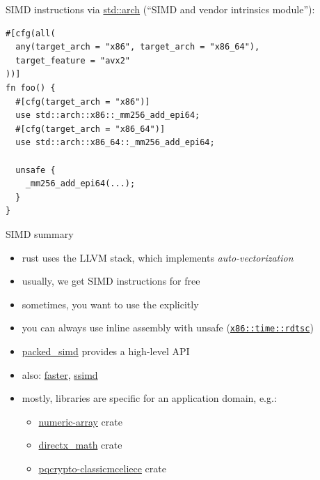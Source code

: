 \documentclass{beamer}
\begin{document}
\begin{frame}[fragile]{SIMD instructions}
  via \href{https://doc.rust-lang.org/1.29.0/std/arch/}{std::arch} (\enquote{SIMD and vendor intrinsics module}):

  \begin{verbatim}
#[cfg(all(
  any(target_arch = "x86", target_arch = "x86_64"),
  target_feature = "avx2"
))]
fn foo() {
  #[cfg(target_arch = "x86")]
  use std::arch::x86::_mm256_add_epi64;
  #[cfg(target_arch = "x86_64")]
  use std::arch::x86_64::_mm256_add_epi64;

  unsafe {
    _mm256_add_epi64(...);
  }
}
  \end{verbatim}
\end{frame}

\begin{frame}[fragile]{SIMD summary}
  \begin{itemize}
    \item rust uses the LLVM stack, which implements \emph{auto-vectorization}
    \item usually, we get SIMD instructions for free
    \item sometimes, you want to use the explicitly
    \item you can always use inline assembly with unsafe (\texttt{\href{https://docs.rs/x86/0.29.0/x86/time/fn.rdtsc.html}{x86::time::rdtsc}})
    \item \href{https://github.com/rust-lang/packed_simd}{packed\_simd} provides a high-level API
    \item also: \href{https://crates.io/crates/faster}{faster}, \href{https://crates.io/crates/ssimd}{ssimd}
    \item mostly, libraries are specific for an application domain, e.g.:
    \begin{itemize}
      \item \href{https://github.com/novacrazy/numeric-array}{numeric-array} crate
      \item \href{https://crates.io/crates/directx_math}{directx\_math} crate
      \item \href{https://crates.io/crates/pqcrypto-classicmceliece}{pqcrypto-classicmceliece} crate
    \end{itemize}
  \end{itemize}
\end{frame}
\end{document}
